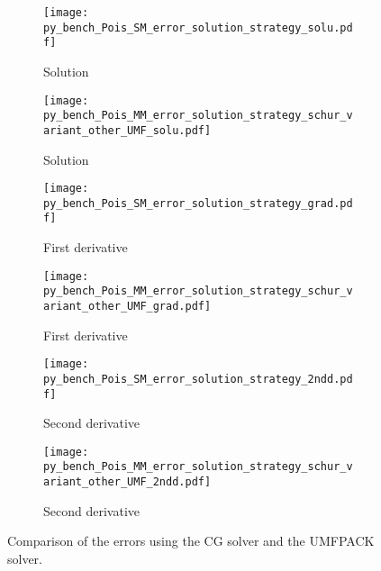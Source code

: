 \documentclass[review,3p]{elsarticle}
\begin{document}
\begin{figure}[!ht]
	\centering
    \begin{subfigure}{5.5cm}
        \texttt{[image: py\_bench\_Pois\_SM\_error\_solution\_strategy\_solu.pdf]}
        \caption{Solution}
        \label{py_bench_Pois_SM_error_solution_strategy_solu}
    \end{subfigure}
    \hspace{-0.2cm}
    \begin{subfigure}{5.5cm}	                		 	
        \texttt{[image: py\_bench\_Pois\_MM\_error\_solution\_strategy\_schur\_variant\_other\_UMF\_solu.pdf]}
        \caption{Solution}
        \label{py_bench_Pois_MM_error_solution_strategy_solu}
    \end{subfigure}

\medskip
	\centering
    \begin{subfigure}{5.5cm}
        \texttt{[image: py\_bench\_Pois\_SM\_error\_solution\_strategy\_grad.pdf]}	
        \caption{First derivative}
        \label{py_bench_Pois_SM_error_solution_strategy_grad}
    \end{subfigure}
    \hspace{-0.2cm}
    \begin{subfigure}{5.5cm}	                		 	
        \texttt{[image: py\_bench\_Pois\_MM\_error\_solution\_strategy\_schur\_variant\_other\_UMF\_grad.pdf]}
        \caption{First derivative}
        \label{py_bench_Pois_MM_error_solution_strategy_grad}
    \end{subfigure}

\medskip
	\centering
    \begin{subfigure}{5.5cm}
        \texttt{[image: py\_bench\_Pois\_SM\_error\_solution\_strategy\_2ndd.pdf]}
        \caption{Second derivative}
        \label{py_bench_Pois_SM_error_solution_strategy_2ndd}
    \end{subfigure}
    \hspace{-0.2cm}
    \begin{subfigure}{5.5cm}	                		 	
        \texttt{[image: py\_bench\_Pois\_MM\_error\_solution\_strategy\_schur\_variant\_other\_UMF\_2ndd.pdf]}
        \caption{Second derivative}
        \label{py_bench_Pois_MM_error_solution_strategy_2ndd}
    \end{subfigure}    
\caption{Comparison of the errors using the CG solver and the UMFPACK solver.}
\label{py_bench_Pois_error_solution_strategy}
\end{figure}
\end{document}
